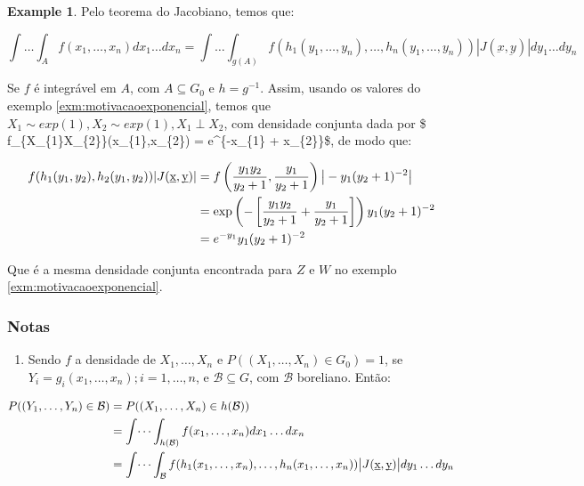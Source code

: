 \documentclass[
]{article}
\providecommand{\tightlist}{%
  \setlength{\itemsep}{0pt}\setlength{\parskip}{0pt}}
\theoremstyle{definition}
\theoremstyle{definition}
\newtheorem{example}{Example}[section]
\theoremstyle{definition}
\theoremstyle{definition}
\theoremstyle{remark}
\begin{document}
\begin{example}
Pelo teorema do Jacobiano, temos que:

\begin{equation*}
\int \ldots \int_{A}f(x_{1}, \ldots, x_{n})dx_{1} \ldots dx_{n} = \int \ldots \int_{g(A)}f(h_{1}(y_{1}, \ldots, y_{n}), \ldots , h_{n}(y_{1}, \ldots, y_{n}))|J(\underbar{x}, \underbar{y})|dy_{1} \ldots dy_{n}
\end{equation*}

Se \(f\) é integrável em \(A\), com \(A \subseteq G_{0}\) e \(h = g^{-1}\). Assim, usando os valores do exemplo \ref{exm:motivacaoexponencial}, temos que \(X_{1} \sim exp(1), X_{2} \sim exp(1), X_{1} \perp X_{2}\), com densidade conjunta dada por \$ f\_\{X\_\{1\}X\_\{2\}\}(x\_\{1\},x\_\{2\}) = e\^{}\{-x\_\{1\} + x\_\{2\}\}\$, de modo que:

\begin{align*}
f(h_{1}(y_{1},y_{2}),h_{2}(y_{1},y_{2}))|J(\underbar{x},\underbar{y})| &= f\left(\frac{y_{1}y_{2}}{y_{2} + 1},\frac{y_{1}}{y_{2} + 1}\right)\big{|}-y_{1}(y_{2} + 1)^{-2}\big{|} \\
&= \exp\left(-\left[\frac{y_{1}y_{2}}{y_{2} + 1}+\frac{y_{1}}{y_{2} + 1}\right]\right)y_{1}(y_{2} + 1)^{-2} \\
&= e^{-y_{1}}y_{1}(y_{2} + 1)^{-2}
\end{align*}

Que é a mesma densidade conjunta encontrada para \(Z\) e \(W\) no exemplo \ref{exm:motivacaoexponencial}.
\end{example}

\hypertarget{notas}{%
\subsubsection{Notas}\label{notas}}

\begin{enumerate}
\def\labelenumi{\arabic{enumi}.}
\tightlist
\item
  Sendo \(f\) a densidade de \(X_{1}, \ldots, X_{n}\) e \(P((X_{1}, \ldots, X_{n}) \in G_{0}) = 1\), se \(Y_{i} = g_{i}(x_{1}, \ldots, x_{n}); i = 1, \ldots, n\), e \(\mathcal{B} \subseteq G\), com \(\mathcal{B}\) boreliano. Então:
\end{enumerate}

\begin{align*}
P((Y_{1},\ldots,Y_{n}) \in \mathcal{B}) &= P((X_{1}, \ldots, X_{n}) \in h(\mathcal{B})) \\
&= \int \dots \int_{h(\mathcal{B})}f(x_{1},\ldots,x_{n})dx_{1} \ldots dx_{n} \\
&= \int \dots \int_{\mathcal{B}}f(h_{1}(x_{1}, \ldots, x_{n}),\ldots,h_{n}(x_{1},\ldots,x_{n}))\big{|}J(\underbar{x},\underbar{y})\big{|}dy_{1} \ldots dy_{n}
\end{align*}
\end{document}
